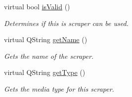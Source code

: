 \begin{DoxyCompactItemize}
virtual bool \hyperlink{class_a_w_e_1_1_j_s_o_n_scraper_abb4ca61ee617b473198a635c6f3ac57d}{is\-Valid} ()
\begin{DoxyCompactList}\small\item\em Determines if this is scraper can be used. \end{DoxyCompactList}\item 
virtual Q\-String \hyperlink{class_a_w_e_1_1_j_s_o_n_scraper_a9a2613e43da4d36040f704d0481fff50}{get\-Name} ()
\begin{DoxyCompactList}\small\item\em Gets the name of the scraper. \end{DoxyCompactList}\item 
virtual Q\-String \hyperlink{class_a_w_e_1_1_j_s_o_n_scraper_a95ff503c69c697cacc121182c4aa5ea4}{get\-Type} ()
\begin{DoxyCompactList}\small\item\em Gets the media type for this scraper. \end{DoxyCompactList}\end{DoxyCompactItemize}

